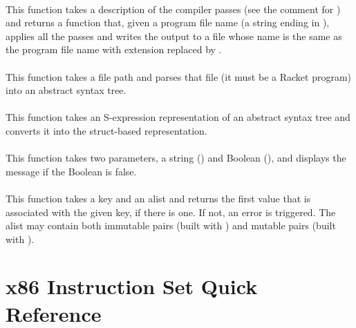 \documentclass[7x10]{TimesAPriori_MIT}%
\def\racketEd{0}
\numberwithin{theorem}{chapter}
\numberwithin{definition}{chapter}
\numberwithin{equation}{chapter}
\begin{document}
{\paragraph{}

This function takes a description of the compiler passes (see the
comment for ) and returns a function that, given a
program file name (a string ending in ), applies all the
passes and writes the output to a file whose name is the same as the
program file name with extension  replaced by .


\paragraph{}

This function takes a file path and parses that file (it must be a
Racket program) into an abstract syntax tree.

\paragraph{}

This function takes an S-expression representation of an abstract
syntax tree and converts it into the struct-based representation.

\paragraph{}

This function takes two parameters, a string () and Boolean
(), and displays the message  if the Boolean
 is false.

\paragraph{}

This function takes a key and an alist and returns the first value that is
associated with the given key, if there is one. If not, an error is
triggered.  The alist may contain both immutable pairs (built with
) and mutable pairs (built with ).


\fi} %

\section{x86 Instruction Set Quick Reference}
\label{sec:x86-quick-reference}
\end{document}

